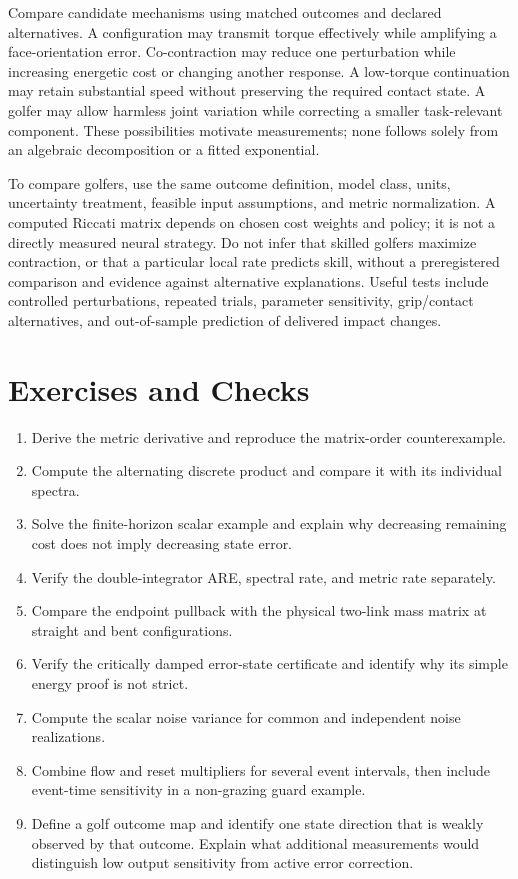 \documentclass[
  10pt,
  letterpaper,
  DIV=11,
  numbers=noendperiod]{scrartcl}
\providecommand{\tightlist}{%
  \setlength{\itemsep}{0pt}\setlength{\parskip}{0pt}}
\begin{document}
Compare candidate mechanisms using matched outcomes and declared
alternatives. A configuration may transmit torque effectively while
amplifying a face-orientation error. Co-contraction may reduce one
perturbation while increasing energetic cost or changing another
response. A low-torque continuation may retain substantial speed without
preserving the required contact state. A golfer may allow harmless joint
variation while correcting a smaller task-relevant component. These
possibilities motivate measurements; none follows solely from an
algebraic decomposition or a fitted exponential.

To compare golfers, use the same outcome definition, model class, units,
uncertainty treatment, feasible input assumptions, and metric
normalization. A computed Riccati matrix depends on chosen cost weights
and policy; it is not a directly measured neural strategy. Do not infer
that skilled golfers maximize contraction, or that a particular local
rate predicts skill, without a preregistered comparison and evidence
against alternative explanations. Useful tests include controlled
perturbations, repeated trials, parameter sensitivity, grip/contact
alternatives, and out-of-sample prediction of delivered impact changes.

\section{Exercises and Checks}\label{exercises-and-checks}

\begin{enumerate}
\def\labelenumi{\arabic{enumi}.}
\tightlist
\item
  Derive the metric derivative and reproduce the matrix-order
  counterexample.
\item
  Compute the alternating discrete product and compare it with its
  individual spectra.
\item
  Solve the finite-horizon scalar example and explain why decreasing
  remaining cost does not imply decreasing state error.
\item
  Verify the double-integrator ARE, spectral rate, and metric rate
  separately.
\item
  Compare the endpoint pullback with the physical two-link mass matrix
  at straight and bent configurations.
\item
  Verify the critically damped error-state certificate and identify why
  its simple energy proof is not strict.
\item
  Compute the scalar noise variance for common and independent noise
  realizations.
\item
  Combine flow and reset multipliers for several event intervals, then
  include event-time sensitivity in a non-grazing guard example.
\item
  Define a golf outcome map and identify one state direction that is
  weakly observed by that outcome. Explain what additional measurements
  would distinguish low output sensitivity from active error correction.
\end{enumerate}
\end{document}
